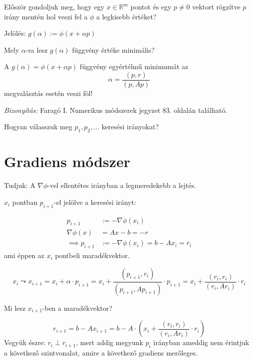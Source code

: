 Először gondoljuk meg, hogy egy $x \in \mathbb{R}^{m}$ pontot és egy $p \neq 0$ vektort rögzítve $p$ irány mentén hol veszi fel a $\phi$ a legkisebb értéket?

Jelölés: $g(\alpha) := \phi(x + \alpha p)$

\begin{kerdes}
    Mely $\alpha$-ra lesz $g(\alpha)$ függvény értéke minimális?
\end{kerdes}

\begin{allitas}
    A $g(\alpha) = \phi(x + \alpha p)$ függvény egyértélmű minimumát az
    \begin{equation*}
        \alpha = \frac{(p, r)}{(p, Ap)}
    \end{equation*}
megvalásztás esetén veszi föl!
\end{allitas}

\textit{Bizonyítás:}
Faragó I. Numerikus módszerek jegyzet 83. oldalán található.\cite{farago}

\begin{kerdes}
    Hogyan válasszuk meg $p_{1}, p_{2}, \dots$ keresési irányokat?
\end{kerdes}


\section{Gradiens módszer}
Tudjuk: A $\nabla \phi$-vel ellentétes irányban a legmeredekebb a lejtés.

$x_{i}$ pontban $p_{i+1}$-el jelölve a keresési irányt:

\begin{align*}
    p_{i+1} & := -\nabla \phi(x_{i}) \\
    \nabla \phi(x) & = Ax - b = -r \\
    \implies p_{i+1} & := - \nabla \phi(x_{i}) = b - Ax_{i} = r_{i}
\end{align*}
ami éppen az $x_{i}$ pontbeli maradékvektor.

\begin{equation*}
    x_{i} \leadsto x_{i+1} = x_{i} + \alpha \cdot p_{i+1} = x_{i} + \frac{(p_{i+1}, r_{i})}{(p_{i+1}, Ap_{i+1})} \cdot p_{i+1} = x_{i} + \frac{(r_{i}, r_{i})}{(r_{i}, Ar_{i})} \cdot r_{i}
\end{equation*}
\begin{kerdes}
    Mi lesz $x_{i+1}$-ben a maradékvektor?
\end{kerdes}
\begin{equation*}
    r_{i+1} = b - Ax_{i+1} = b - A \cdot \left(x_{i} + \frac{(r_{i}, r_{i})}{(r_{i}, Ar_{i})} \cdot r_{i}\right)
\end{equation*}
Vegyük észre: $r_{i} \perp r_{i+1}$, mert addig megyunk $p_{i}$ irányban ameddig nem érintjuk a következő szintvonalat, amire a következő gradiens merőleges.

